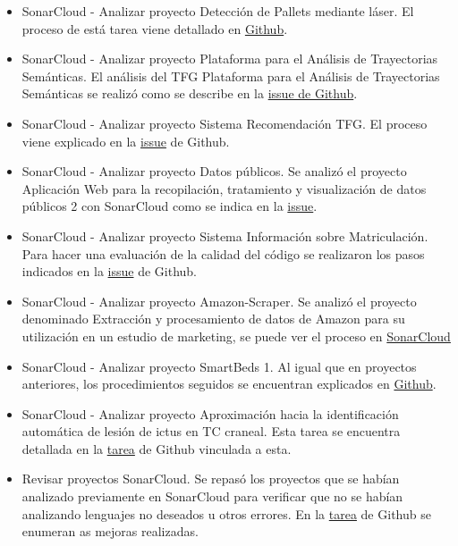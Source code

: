 \begin{itemize}
	\item SonarCloud - Analizar proyecto Detección de Pallets mediante láser. 
		El proceso de está tarea viene detallado en \href{https://github.com/dbo1001/Gestor-TFG-2021/issues/158}{Github}.
	\item SonarCloud - Analizar proyecto Plataforma para el Análisis de Trayectorias Semánticas. 
		El análisis del TFG Plataforma para el Análisis de Trayectorias Semánticas se realizó como se describe en la \href{https://github.com/dbo1001/Gestor-TFG-2021/issues/157}{issue de Github}.
	\item SonarCloud - Analizar proyecto Sistema Recomendación TFG. 
		El proceso viene explicado en la \href{https://github.com/dbo1001/Gestor-TFG-2021/issues/156}{issue} de Github.
	\item SonarCloud - Analizar proyecto Datos públicos. 
		Se analizó el proyecto Aplicación Web para la recopilación, tratamiento y visualización de datos públicos 2 con SonarCloud como se indica en la \href{https://github.com/dbo1001/Gestor-TFG-2021/issues/155}{issue}.
	\item SonarCloud - Analizar proyecto Sistema Información sobre Matriculación. 
		Para hacer una evaluación de la calidad del código se realizaron los pasos indicados en la \href{https://github.com/dbo1001/Gestor-TFG-2021/issues/152}{issue} de Github.
	\item SonarCloud - Analizar proyecto Amazon-Scraper. 
		Se analizó el proyecto denominado Extracción y procesamiento de datos de Amazon para su utilización en un estudio de marketing, se puede ver el proceso en \href{https://github.com/dbo1001/Gestor-TFG-2021/issues/151}{SonarCloud}
	\item SonarCloud - Analizar proyecto SmartBeds 1.
		Al igual que en proyectos anteriores, los procedimientos seguidos se encuentran explicados en \href{https://github.com/dbo1001/Gestor-TFG-2021/issues/149}{Github}.
	\item SonarCloud - Analizar proyecto Aproximación hacia la identificación automática de lesión de ictus en TC craneal.
		Esta tarea se encuentra detallada en la \href{https://github.com/dbo1001/Gestor-TFG-2021/issues/146}{tarea} de Github vinculada a esta.
	\item Revisar proyectos SonarCloud. 
		Se repasó los proyectos que se habían analizado previamente en SonarCloud para verificar que no se habían analizando lenguajes no deseados u otros errores. En la \href{https://github.com/dbo1001/Gestor-TFG-2021/issues/123}{tarea} de Github se enumeran as mejoras realizadas.

\end{itemize}
